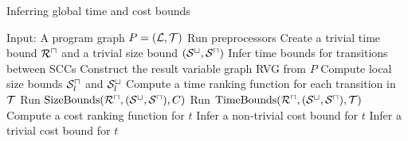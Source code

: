 
\begin{algorithm}
\caption{Inferring global time and cost bounds}\label{complete_algorithm}
\begin{algorithmic}[1]
  \State Input: A program graph $P = (\mathcal{L}, \mathcal{T})$
  \State Run preprocessors
  \State Create a trivial time bound ${\mathcal{R}^\sqcap}$ and a trivial size bound ${({\mathcal{S}^\sqcup}, {\mathcal{S}^\sqcap})}$
  \State Infer time bounds for transitions between SCCs
  \State Construct the result variable graph RVG from $P$
  \State Compute local size bounds ${\mathcal{S}^\sqcap_l}$ and ${\mathcal{S}^\sqcup_l}$
  \State Compute a time ranking function for each transition in $\mathcal{T}$
  \Repeat
      \State Run $\text{SizeBounds}({\mathcal{R}^\sqcap}, {({\mathcal{S}^\sqcup}, {\mathcal{S}^\sqcap})}, C)$
    \EndFor
      \State Run $\text{TimeBounds}({\mathcal{R}^\sqcap}, {({\mathcal{S}^\sqcup}, {\mathcal{S}^\sqcap})}, \mathcal{T})$
    \EndFor
    \State Compute a cost ranking function for $t$
      \State Infer a non-trivial cost bound for $t$
    \Else
      \State Infer a trivial cost bound for $t$
    \EndIf
  \EndFor
\end{algorithmic}
\end{algorithm}

